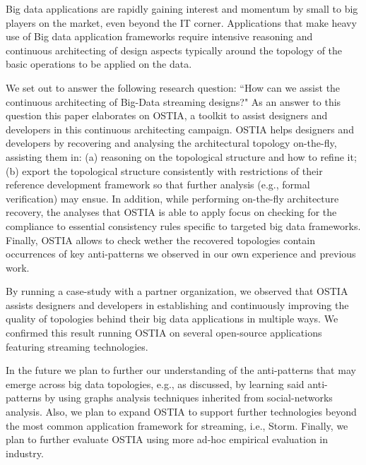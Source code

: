 Big data applications are rapidly gaining interest and momentum by small to big players on the market, even beyond the IT corner. Applications that make heavy use of Big data application frameworks require intensive reasoning and continuous architecting of design aspects typically around the topology of the basic operations to be applied on the data. 

We set out to answer the following research question: ``How can we assist the continuous architecting of Big-Data streaming designs?" As an answer to this question this paper elaborates on OSTIA, a toolkit to assist designers and developers in this continuous architecting campaign. OSTIA helps designers and developers by recovering and analysing the architectural topology on-the-fly, assisting them in: (a) reasoning on the topological structure and how to refine it; (b) export the topological structure consistently with restrictions of their reference development framework so that further analysis (e.g., formal verification) may ensue. In addition, while performing on-the-fly architecture recovery, the analyses that OSTIA is able to apply focus on checking for the compliance to essential consistency rules specific to targeted big data frameworks. Finally, OSTIA allows to check wether the recovered topologies contain occurrences of key anti-patterns we observed in our own experience and previous work. 

By running a case-study with a partner organization, we observed that OSTIA assists designers and developers in establishing and continuously improving the quality of topologies behind their big data applications in multiple ways. We confirmed this result running OSTIA on several open-source applications featuring streaming technologies.
 
In the future we plan to further our understanding of the anti-patterns that may emerge across big data topologies, e.g., as discussed, by learning said anti-patterns by using graphs analysis techniques inherited from social-networks analysis. Also, we plan to expand OSTIA to support further technologies beyond the most common application framework for streaming, i.e., Storm. Finally, we plan to further evaluate OSTIA using more ad-hoc empirical evaluation in industry.